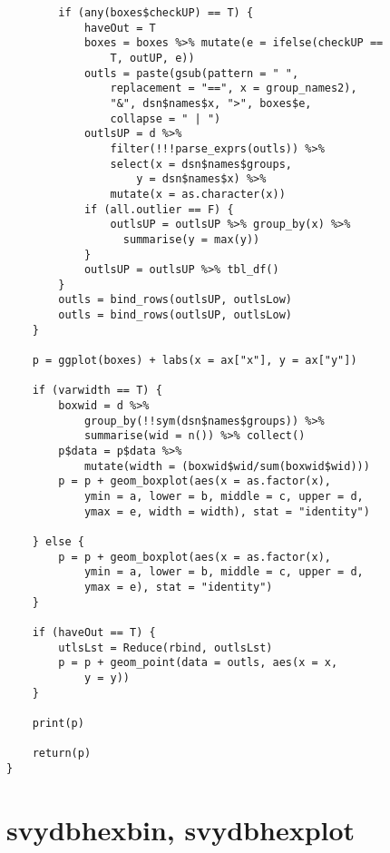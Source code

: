 \begin{lstlisting}
        if (any(boxes$checkUP) == T) {
            haveOut = T
            boxes = boxes %>% mutate(e = ifelse(checkUP == 
                T, outUP, e))
            outls = paste(gsub(pattern = " ", 
                replacement = "==", x = group_names2), 
                "&", dsn$names$x, ">", boxes$e, 
                collapse = " | ")
            outlsUP = d %>% 
                filter(!!!parse_exprs(outls)) %>% 
                select(x = dsn$names$groups,
                    y = dsn$names$x) %>% 
                mutate(x = as.character(x))
            if (all.outlier == F) {
                outlsUP = outlsUP %>% group_by(x) %>% 
                  summarise(y = max(y))
            }
            outlsUP = outlsUP %>% tbl_df()
        }
        outls = bind_rows(outlsUP, outlsLow)
        outls = bind_rows(outlsUP, outlsLow)
    }
    
    p = ggplot(boxes) + labs(x = ax["x"], y = ax["y"])
    
    if (varwidth == T) {
        boxwid = d %>% 
            group_by(!!sym(dsn$names$groups)) %>% 
            summarise(wid = n()) %>% collect()
        p$data = p$data %>% 
            mutate(width = (boxwid$wid/sum(boxwid$wid)))
        p = p + geom_boxplot(aes(x = as.factor(x), 
            ymin = a, lower = b, middle = c, upper = d, 
            ymax = e, width = width), stat = "identity")
        
    } else {
        p = p + geom_boxplot(aes(x = as.factor(x), 
            ymin = a, lower = b, middle = c, upper = d, 
            ymax = e), stat = "identity")
    }
    
    if (haveOut == T) {
        utlsLst = Reduce(rbind, outlsLst)
        p = p + geom_point(data = outls, aes(x = x, 
            y = y))
    }
    
    print(p)
    
    return(p)
}
\end{lstlisting}


\section{svydbhexbin, svydbhexplot}

